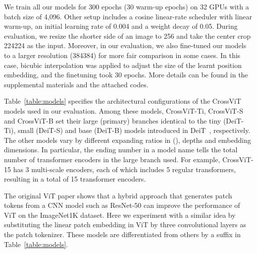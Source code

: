 \documentclass[10pt,twocolumn,letterpaper]{article}
\def\ours{CrossViT\xspace}
\newcommand{\myparagraph}[1]{\vspace{1mm} \noindent {\textbf{#1}}}
\begin{document}
We train all our models for 300 epochs (30 warm-up epochs) on 32 GPUs with a batch size of 4,096. Other setup includes a cosine linear-rate scheduler with linear warm-up, an initial learning rate of 0.004 and a weight decay of 0.05. During evaluation, we resize the shorter side of an image to 256 and take the center crop 224224 as the input.
Moreover, in our evaluation, we also fine-tuned our models to a larger resolution (384384) for more fair comparison in some cases. In this case, bicubic interpolation was applied to adjust the size of the learnt position embedding, and the finetuning took 30 epochs.
More details can be found in the supplemental materials and the attached codes.

\myparagraph{Models.}
Table~\ref{table:models} specifies the architectural configurations of the \ours models used in our evaluation. Among these models, \ours-Ti, \ours-S and \ours-B set their large (primary) branches identical to the tiny (DeiT-Ti), small (DeiT-S) and base (DeiT-B) models introduced in DeiT~\cite{DeiT_touvron2020}, respectively. 
The other models vary by different expanding ratios in  (), depths and embedding dimensions. In particular, the ending number in a model name tells the total number of transformer encoders in the large branch used. For example, \ours-15 has 3 multi-scale encoders, each of which includes 5 regular transformers, resulting in a total of 15 transformer encoders. 

The original ViT paper shows that a hybrid approach that generates patch tokens from a CNN model such as ResNet-50 can improve the performance of ViT on the ImageNet1K dataset. Here we experiment with a similar idea by substituting the linear patch embedding in ViT by three convolutional layers as the patch tokenizer. These models are differentiated from others by a suffix  in Table~\ref{table:models}. 
\end{document}
